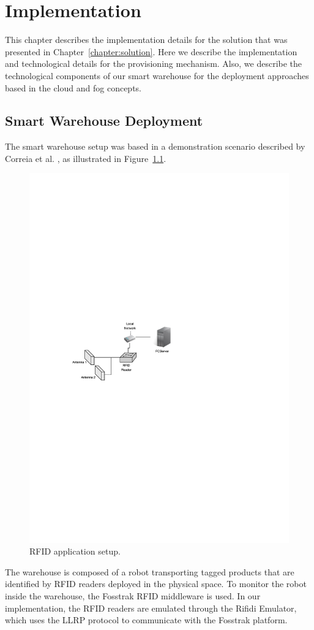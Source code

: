 
\chapter{Implementation}
\label{chapter:implementation}
This chapter describes the implementation details for the solution that was presented in Chapter~\ref{chapter:solution}.
Here we describe the implementation and technological details for the provisioning mechanism.
Also, we describe the technological components of our smart warehouse for the deployment approaches
based in the cloud and fog concepts.

\section{Smart Warehouse Deployment}
\label{sec:impl_smart_place}
The smart warehouse setup was based in a demonstration scenario described by Correia et al. \cite{correiaalpharfid},
as illustrated in Figure~\ref{fig:rfidapp_setup}.\\

\begin{figure}[ht!]
  \centering
  \includegraphics[width=.6\textwidth]{./images/rfidapp_setup}
  \caption[RFID application setup.]{RFID application setup.}
  \label{fig:rfidapp_setup}
\end{figure}

The warehouse is composed of a robot transporting tagged products that are identified by \gls{RFID} readers
deployed in the physical space. To monitor the robot inside the warehouse, the Fosstrak \gls{RFID} middleware
is used. In our implementation, the \gls{RFID} readers are emulated through the Rifidi Emulator, which uses
the \gls{LLRP} protocol to communicate with the Fosstrak platform.

